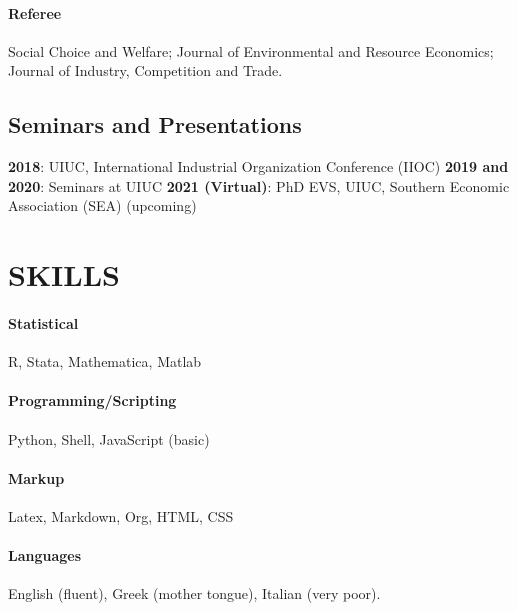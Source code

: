 \documentclass{article}
\begin{document}
\paragraph{Referee} Social Choice and Welfare; Journal of Environmental and Resource Economics; Journal of Industry, Competition and Trade.
\subsection{Seminars and Presentations}
{\bf 2018}: UIUC, International Industrial Organization Conference (IIOC) {\bf 2019 and 2020}: Seminars at UIUC {\bf 2021 (Virtual)}: PhD EVS, UIUC, Southern Economic Association (SEA) (upcoming)


\section{SKILLS}
\paragraph{Statistical} R, Stata, Mathematica, Matlab
\paragraph{Programming/Scripting} Python, Shell, JavaScript (basic)
\paragraph{Markup} Latex, Markdown, Org, HTML, CSS
\paragraph{Languages} English (fluent), Greek (mother tongue), Italian (very poor).


\end{document}
